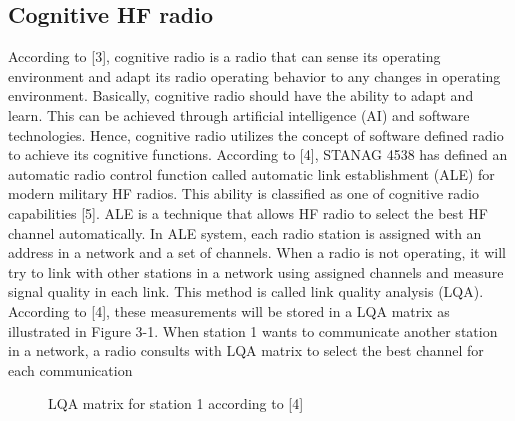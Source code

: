 \documentclass[conference]{IEEEtran}
\begin{document}
\subsection{Cognitive HF radio}
According to [3], cognitive radio is a radio that can sense its operating environment and adapt its radio operating behavior to any changes in operating environment. Basically, cognitive radio should have the ability to adapt and learn. This can be achieved through artificial intelligence (AI) and software technologies. Hence, cognitive radio utilizes the concept of software defined radio to achieve its cognitive functions. 
According to [4], STANAG 4538 has defined an automatic radio control function called automatic link establishment (ALE) for modern military HF radios. This ability is classified as one of cognitive radio capabilities [5]. ALE is a technique that allows HF radio to select the best HF channel automatically. In ALE system, each radio station is assigned with an address in a network and a set of channels. When a radio is not operating, it will try to link with other stations in a network using assigned channels and measure signal quality in each link. This method is called link quality analysis (LQA). According to [4], these measurements will be stored in a LQA matrix as illustrated in Figure 3-1. When station 1 wants to communicate another station in a network, a radio consults with LQA matrix to select the best channel for each communication


\begin{figure}[h!]
	\centering
	\caption{LQA matrix for station 1 according to [4]}
\end{figure}
\end{document}
